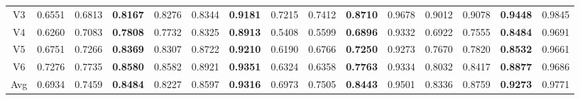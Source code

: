 \begin{table}[t!]
\begin{center}
\begin{footnotesize}
\begin{tabular}{|c|ccc|ccc|cccc|cccc|}
  \\

V3 & 0.6551 & 0.6813 & \textbf{0.8167} & 0.8276 & 0.8344 & \textbf{0.9181} & 0.7215 & 0.7412 & \textbf{0.8710} & 0.9678 & 0.9012 & 0.9078 & \textbf{0.9448} & 0.9845 

  \\

V4 & 0.6260 & 0.7083 & \textbf{0.7808} & 0.7732 & 0.8325 & \textbf{0.8913} & 0.5408 & 0.5599 & \textbf{0.6896} & 0.9332 & 0.6922 & 0.7555 & \textbf{0.8484} & 0.9691  

  \\

V5 & 0.6751 & 0.7266 & \textbf{0.8369} & 0.8307 & 0.8722 & \textbf{0.9210} & 0.6190 & 0.6766 & \textbf{0.7250} & 0.9273 & 0.7670 & 0.7820 & \textbf{0.8532} & 0.9661  

  \\

V6 & 0.7276 & 0.7735 & \textbf{0.8580} & 0.8582 & 0.8921 & \textbf{0.9351} & 0.6324 & 0.6358 & \textbf{0.7763} & 0.9334 & 0.8032 & 0.8417 & \textbf{0.8877} & 0.9686  

\\

\hline
Avg  & 0.6934 & 0.7459 & \textbf{0.8484} & 0.8227 & 0.8597
 & \textbf{0.9316} & 0.6973 & 0.7505  & \textbf{0.8443} & 0.9501 & 0.8336  & 0.8759 & \textbf{0.9273} & 0.9771  

\\

\hline
\end{tabular}
\label{ptbxl_ptbdb_fulldata}
\end{footnotesize}

\end{center}
\end{table}